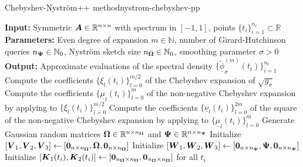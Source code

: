 \begin{algo}{Chebyshev-Nyström++ method}{nystrom-chebyshev-pp}
\begin{algorithmic}[1]
    \Statex \textbf{Input:} Symmetric $\boldsymbol{A} \in \mathbb{R}^{n \times n}$ with spectrum in $[-1, 1]$, points $\{t_i\}_{i=1}^{n_t} \subset \mathbb{R}$
    \Statex \textbf{Parameters:} Even degree of expansion $m \in \mathbb{N}$, number of Girard-Hutchinson queries $n_{\boldsymbol{\Psi}} \in \mathbb{N}_0$, Nyström sketch size $n_{\boldsymbol{\Omega}} \in \mathbb{N}_0$,  smoothing parameter $\sigma > 0$
    \Statex \textbf{Output:} Approximate evaluations of the spectral density $\{\widetilde{\underline{\phi}}_{\sigma}^{(m)}(t_i)\}_{i=1}^{n_t}$
        \State Compute the coefficients $\{\xi_l(t_i)\}_{l=0}^{m/2}$ of the Chebyshev expansion of $\sqrt{g_{\sigma}}$ 
        \State Compute the coefficients $\{\underline{\mu}_l(t_i)\}_{l=0}^{m}$ of the non-negative Chebyshev expansion by applying  to $\{\xi_l(t_i)\}_{l=0}^{m/2}$
        \State Compute the coefficients $\{\underline{\nu}_l(t_i)\}_{l=0}^{2m}$ of the square of the non-negative Chebyshev expansion by applying  to $\{\underline{\mu}_l(t_i)\}_{l=0}^{m}$
    \EndFor
    \State Generate Gaussian random matrices $\boldsymbol{\Omega} \in \mathbb{R}^{n \times n_{\boldsymbol{\Omega}}}$ and $\boldsymbol{\Psi} \in \mathbb{R}^{n \times n_{\boldsymbol{\Psi}}}$%
    \State Initialize $[\boldsymbol{V}_1, \boldsymbol{V}_2, \boldsymbol{V}_3] \gets [\boldsymbol{0}_{n \times n_{\boldsymbol{\Omega}}}, \boldsymbol{\boldsymbol{\Omega}}, \boldsymbol{0}_{n \times n_{\boldsymbol{\Omega}}}]$
    \State Initialize $[\boldsymbol{W}_1, \boldsymbol{W}_2, \boldsymbol{W}_3] \gets [\boldsymbol{0}_{n \times n_{\boldsymbol{\Psi}}}, \boldsymbol{\Psi}, \boldsymbol{0}_{n \times n_{\boldsymbol{\Psi}}}]$
    \State Initialize $[\boldsymbol{K}_1(t_i), \boldsymbol{K}_2(t_i)] \gets [\boldsymbol{0}_{n_{\boldsymbol{\Omega}} \times n_{\boldsymbol{\Omega}}}, \boldsymbol{0}_{n_{\boldsymbol{\Omega}} \times n_{\boldsymbol{\Omega}}}]$ for all $t_i$

\end{algorithmic}
\end{algo}
